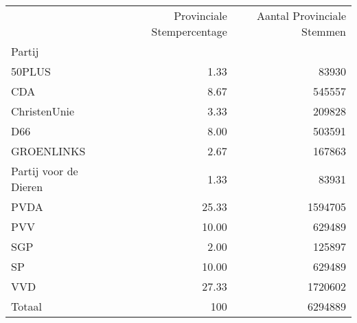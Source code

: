 \begin{tabular}{lrr}
\toprule
{} &  Provinciale Stempercentage &  Aantal Provinciale Stemmen \\
Partij                &                             &                             \\
\midrule
50PLUS                &                        1.33 &                       83930 \\
CDA                   &                        8.67 &                      545557 \\
ChristenUnie          &                        3.33 &                      209828 \\
D66                   &                        8.00 &                      503591 \\
GROENLINKS            &                        2.67 &                      167863 \\
Partij voor de Dieren &                        1.33 &                       83931 \\
PVDA                  &                       25.33 &                     1594705 \\
PVV                   &                       10.00 &                      629489 \\
SGP                   &                        2.00 &                      125897 \\
SP                    &                       10.00 &                      629489 \\
VVD                   &                       27.33 &                     1720602 \\
\midrule
Totaal			&								100	&						6294889		\\
\bottomrule
\end{tabular}
